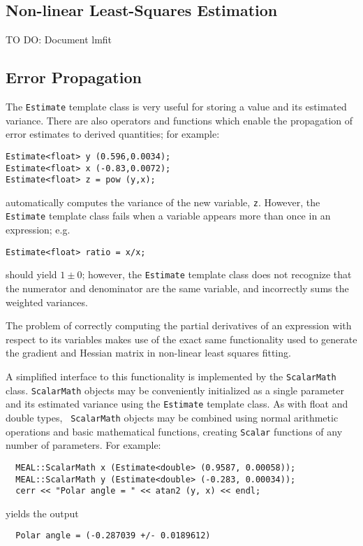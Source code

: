 \documentclass[12pt]{article}
\begin{document}
\subsection{Non-linear Least-Squares Estimation}

TO DO: Document lmfit

\subsection{Error Propagation}

The {\tt Estimate} template class is very useful for storing a value
and its estimated variance.  There are also operators and functions
which enable the propagation of error estimates to derived quantities;
for example:
\begin{verbatim}
Estimate<float> y (0.596,0.0034);
Estimate<float> x (-0.83,0.0072);
Estimate<float> z = pow (y,x);
\end{verbatim}
automatically computes the variance of the new variable, {\tt z}.
However, the {\tt Estimate} template class fails when a variable
appears more than once in an expression; e.g.
\begin{verbatim}
Estimate<float> ratio = x/x;
\end{verbatim}
should yield $1\pm0$; however, the {\tt Estimate} template class does
not recognize that the numerator and denominator are the same
variable, and incorrectly sums the weighted variances.

The problem of correctly computing the partial derivatives of an
expression with respect to its variables makes use of the exact same
functionality used to generate the gradient and Hessian matrix in
non-linear least squares fitting.

A simplified interface to this functionality is implemented by the
{\tt ScalarMath} class.  {\tt ScalarMath} objects may be conveniently
initialized as a single parameter and its estimated variance using the
{\tt Estimate} template class.  As with float and double types, {\tt
ScalarMath} objects may be combined using normal arithmetic operations
and basic mathematical functions, creating {\tt Scalar} functions of
any number of parameters.  For example:
\begin{verbatim}
  MEAL::ScalarMath x (Estimate<double> (0.9587, 0.00058));
  MEAL::ScalarMath y (Estimate<double> (-0.283, 0.00034));
  cerr << "Polar angle = " << atan2 (y, x) << endl;
\end{verbatim}
yields the output
\begin{verbatim}
  Polar angle = (-0.287039 +/- 0.0189612)
\end{verbatim}
\end{document}
